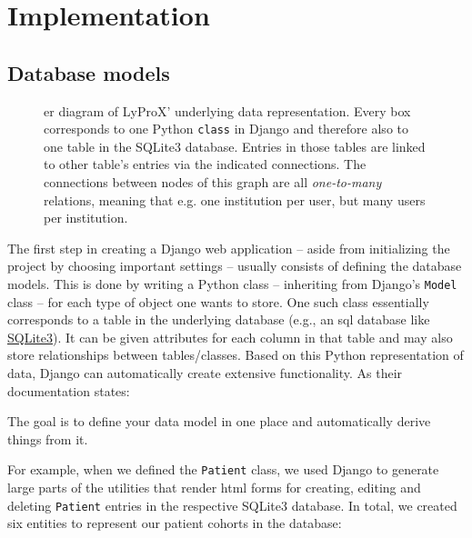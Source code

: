\documentclass[\relativeRoot/main.tex]{subfiles}
\begin{document}
\section{Implementation}
\label{sec:lyprox:implementation}

\subsection*{Database models}
\label{subsec:lyprox:implementation:models}

\begin{figure}
    \centering
    \def\svgwidth{1.0\textwidth}
    
    \caption[
        ER diagram of LyProX' data model
    ]{
        \Gls{er} diagram of LyProX' underlying data representation. Every box corresponds to one Python \texttt{class} in Django and therefore also to one table in the SQLite3 database. Entries in those tables are linked to other table's entries via the indicated connections. The connections between nodes of this graph are all \emph{one-to-many} relations, meaning that e.g. one institution per user, but many users per institution.
    }
    \label{fig:lyprox:er_diagram}
\end{figure}

The first step in creating a Django web application -- aside from initializing the project by choosing important settings -- usually consists of defining the database models. This is done by writing a Python class -- inheriting from Django's \texttt{Model} class -- for each type of object one wants to store. One such class essentially corresponds to a table in the underlying database (e.g., an \acrshort{sql} database like \href{https://www.sqlite.org/index.html}{SQLite3}). It can be given attributes for each column in that table and may also store relationships between tables/classes. Based on this Python representation of data, Django can automatically create extensive functionality. As their documentation states: 

\begin{displayquote}
    The goal is to define your data model in one place and automatically derive things from it.
\end{displayquote}

For example, when we defined the \texttt{Patient} class, we used Django to generate large parts of the utilities that render \acrshort{html} forms for creating, editing and deleting \texttt{Patient} entries in the respective SQLite3 database. In total, we created six entities to represent our patient cohorts in the database:
\end{document}

